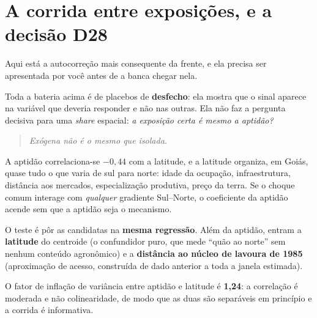 \section{A corrida entre exposições, e a decisão D28}

Aqui está a autocorreção mais consequente da frente, e ela precisa ser
apresentada por você antes de a banca chegar nela.

Toda a bateria acima é de placebos de \textbf{desfecho}: ela mostra que o sinal
aparece na variável que deveria responder e não nas outras. Ela não faz a
pergunta decisiva para uma \emph{share} espacial: \emph{a exposição certa é
mesmo a aptidão?}

\begin{quote}\itshape\color{cortinta}
Exógena não é o mesmo que isolada.
\end{quote}

A aptidão correlaciona-se $-0{,}44$ com a latitude, e a latitude organiza, em
Goiás, quase tudo o que varia de sul para norte: idade da ocupação,
infraestrutura, distância aos mercados, especialização produtiva, preço da
terra. Se o choque comum interage com \emph{qualquer} gradiente Sul--Norte, o
coeficiente da aptidão acende sem que a aptidão seja o mecanismo.

O teste é pôr as candidatas na \textbf{mesma regressão}. Além da aptidão,
entram a \textbf{latitude} do centroide (o confundidor puro, que mede ``quão ao
norte'' sem nenhum conteúdo agronômico) e a \textbf{distância ao núcleo de
lavoura de 1985} (aproximação de acesso, construída de dado anterior a toda a
janela estimada).

O fator de inflação de variância entre aptidão e latitude é \textbf{1,24}: a
correlação é moderada e não colinearidade, de modo que as duas são separáveis em
princípio e a corrida é informativa.

